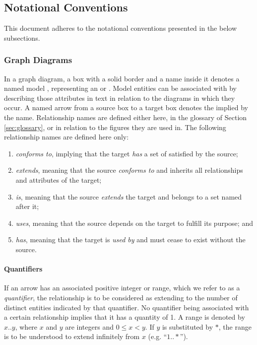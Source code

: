 \newpage

\subsection{Notational Conventions}
\label{sec:introduction:conventions}

This document adheres to the notational conventions presented in the below subsections.

\subsubsection{Graph Diagrams}
\label{sec:introduction:conventions:graphs}

In a graph diagram, a box with a solid border and a name inside it denotes a named model , representing an  or .
Model entities can be associated with  by describing those attributes in text in relation to the diagrams in which they occur.
A named arrow from a source box to a target box denotes the  implied by the name.
Relationship names are defined either here, in the glossary of Section \ref{sec:glossary}, or in relation to the figures they are used in.
The following relationship names are defined here only:

\begin{enumerate}
\item \textit{conforms to}, implying that the target \textit{has} a set of  satisfied by the source;
\item \textit{extends}, meaning that the source \textit{conforms to} and inherits all relationships and attributes of the target;
\item \textit{is}, meaning that the source \textit{extends} the target and belongs to a set named after it;
\item \textit{uses}, meaning that the source depends on the target to fulfill its purpose; and
\item \textit{has}, meaning that the target is \textit{used by} and must cease to exist without the source.
\end{enumerate}

\paragraph{Quantifiers}
If an arrow has an associated positive integer or range, which we refer to as a \textit{quantifier}, the relationship is to be considered as extending to the number of distinct entities indicated by that quantifier.
No quantifier being associated with a certain relationship implies that it has a quantity of 1.
A range is denoted by $x..y$, where $x$ and $y$ are integers and $0 \leq x < y$.
If $y$ is substituted by $*$, the range is to be understood to extend infinitely from $x$ (e.g. ``$1..*$'').

